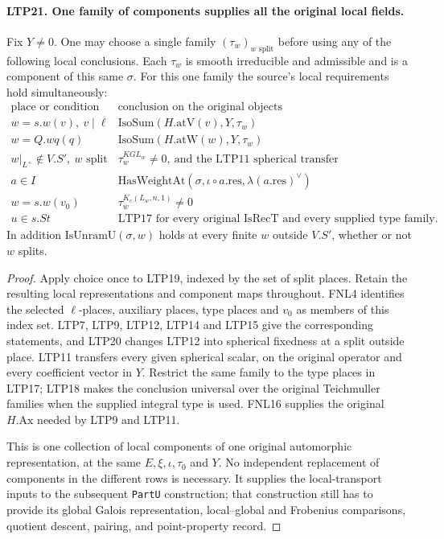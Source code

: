 \documentclass[11pt,a4paper]{article}
\numberwithin{equation}{section}
\theoremstyle{remark}\newtheorem{remark}[theorem]{Remark}
\begin{document}
\paragraph{LTP21. One family of components supplies all the original local fields.}
\label{claim:LTP21}
Fix \(Y\ne0\).  One may choose a single family
\((\tau_w)_{w\text{ split}}\) before using any of the following
local conclusions.  Each \(\tau_w\) is smooth irreducible and
admissible and is a component of this same \(\sigma\).  For this
one family the source's local requirements hold simultaneously:
\[
\begin{array}{c|l}
 \text{place or condition}&\text{conclusion on the original objects}\\ \hline
 w=s.w(v),\ v\mid\ell&\mathrm{IsoSum}(H.\mathrm{atV}(v),Y,\tau_w)\\
 w=Q.wq(q)&\mathrm{IsoSum}(H.\mathrm{atW}(w),Y,\tau_w)\\
 w|_{L^+}\notin V.S',\ w\text{ split}
       &\tau_w^{KGL_w}\ne0,\ \text{and the LTP11 spherical transfer}\\
 a\in I&\mathrm{HasWeightAt}(\sigma,\iota\circ a.\mathrm{res},
                                               \lambda(a.\mathrm{res})^\vee)\\
 w=s.w(v_0)&\tau_w^{K_c(L_w,n,1)}\ne0\\
 u\in s.St&\text{LTP17 for every original }\mathrm{IsRecT}
                 \text{ and every supplied type family.}
\end{array}
\]
In addition \(\mathrm{IsUnramU}(\sigma,w)\) holds at every
finite \(w\) outside \(V.S'\), whether or not \(w\) splits.
\begin{proof}
Apply choice once to LTP19, indexed by the set of split places.
Retain the resulting local representations and component maps
throughout.  FNL4 identifies the selected \(\ell\)-places,
auxiliary places, type places and \(v_0\) as members of this
index set.  LTP7, LTP9, LTP12, LTP14 and LTP15 give the
corresponding statements, and LTP20 changes LTP12 into spherical
fixedness at a split outside place.  LTP11 transfers every
given spherical scalar, on the original operator and every
coefficient vector in \(Y\).  Restrict the same family to the
type places in LTP17; LTP18 makes the conclusion universal over
the original Teichmuller families when the supplied integral
type is used.  FNL16 supplies the original \(H.\mathrm{Ax}\)
needed by LTP9 and LTP11.

This is one collection of local components of one original
automorphic representation, at the same \(E,\xi,\iota,\tau_0\)
and \(Y\).  No independent replacement of components in the
different rows is necessary.  It supplies the local-transport
inputs to the subsequent \texttt{Part\allowbreak U} construction; that
construction still has to provide its global Galois representation,
local--global and Frobenius comparisons, quotient descent,
pairing, and point-property record.
\end{proof}
\end{document}
